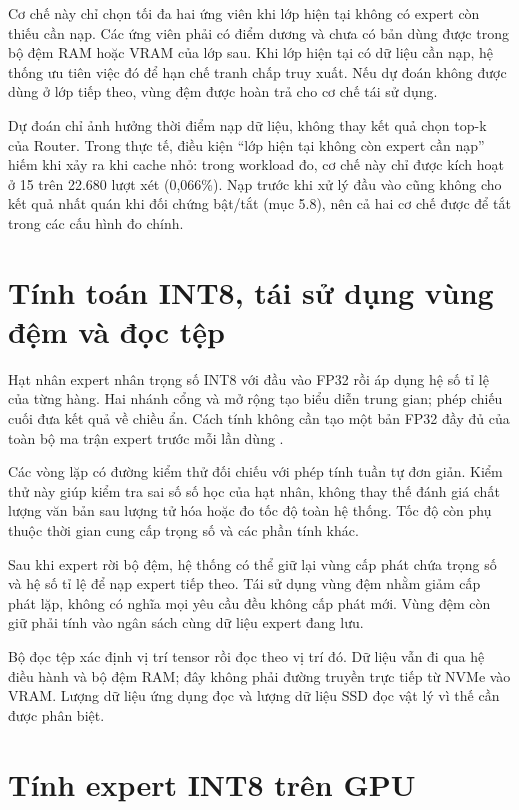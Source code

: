 Cơ chế này chỉ chọn tối đa hai ứng viên khi lớp hiện tại không có expert còn thiếu cần nạp. Các ứng viên phải có điểm dương và chưa có bản dùng được trong bộ đệm RAM hoặc VRAM của lớp sau. Khi lớp hiện tại có dữ liệu cần nạp, hệ thống ưu tiên việc đó để hạn chế tranh chấp truy xuất. Nếu dự đoán không được dùng ở lớp tiếp theo, vùng đệm được hoàn trả cho cơ chế tái sử dụng.

Dự đoán chỉ ảnh hưởng thời điểm nạp dữ liệu, không thay kết quả chọn top-k của Router. Trong thực tế, điều kiện ``lớp hiện tại không còn expert cần nạp'' hiếm khi xảy ra khi cache nhỏ: trong workload đo, cơ chế này chỉ được kích hoạt ở 15 trên 22.680 lượt xét (0,066\%). Nạp trước khi xử lý đầu vào cũng không cho kết quả nhất quán khi đối chứng bật/tắt (mục 5.8), nên cả hai cơ chế được để tắt trong các cấu hình đo chính.

\section{Tính toán INT8, tái sử dụng vùng đệm và đọc tệp}

Hạt nhân expert nhân trọng số INT8 với đầu vào FP32 rồi áp dụng hệ số tỉ lệ của từng hàng. Hai nhánh cổng và mở rộng tạo biểu diễn trung gian; phép chiếu cuối đưa kết quả về chiều ẩn. Cách tính không cần tạo một bản FP32 đầy đủ của toàn bộ ma trận expert trước mỗi lần dùng \cite{moe_tierengine_arch}.

Các vòng lặp có đường kiểm thử đối chiếu với phép tính tuần tự đơn giản. Kiểm thử này giúp kiểm tra sai số số học của hạt nhân, không thay thế đánh giá chất lượng văn bản sau lượng tử hóa hoặc đo tốc độ toàn hệ thống. Tốc độ còn phụ thuộc thời gian cung cấp trọng số và các phần tính khác.

Sau khi expert rời bộ đệm, hệ thống có thể giữ lại vùng cấp phát chứa trọng số và hệ số tỉ lệ để nạp expert tiếp theo. Tái sử dụng vùng đệm nhằm giảm cấp phát lặp, không có nghĩa mọi yêu cầu đều không cấp phát mới. Vùng đệm còn giữ phải tính vào ngân sách cùng dữ liệu expert đang lưu.

Bộ đọc tệp xác định vị trí tensor rồi đọc theo vị trí đó. Dữ liệu vẫn đi qua hệ điều hành và bộ đệm RAM; đây không phải đường truyền trực tiếp từ NVMe vào VRAM. Lượng dữ liệu ứng dụng đọc và lượng dữ liệu SSD đọc vật lý vì thế cần được phân biệt.

\section{Tính expert INT8 trên GPU}

